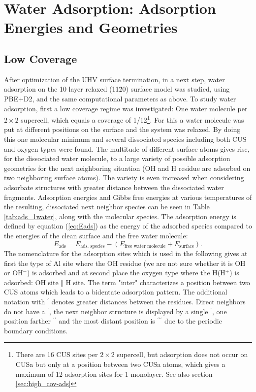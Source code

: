 \documentclass[11pt,DIV=13,BCOR=5mm,a4paper,headinclude]{scrbook}
\begin{document}
\section{Water Adsorption: Adsorption Energies and Geometries}\label{structure_search11-20}
\subsection{Low Coverage}
After optimization of the UHV surface termination, in a next step, water adsorption on the 10 layer relaxed (11\=20) surface model was studied, using PBE+D2, and the same computational parameters as above.
To study water adsorption, first a low coverage regime was investigated: One water molecule per $2\times 2$ supercell, which equals a coverage of 1/12\footnote{There are 16 CUS sites per $2\times 2$ supercell, but adsorption does not occur on CUSa but only at a position between two CUSa atoms, which gives a maximum of 12 adsorption sites for 1 monolayer. See also section \ref{sec:high_cov-ads}}.
For this a water molecule was put at different positions on the surface and the system was relaxed.
By doing this one molecular minimum and several dissociated species including both CUS and oxygen types were found.
The multitude of different surface atoms gives rise, for the dissociated water molecule, to a large variety of possible adsorption geometries for the next neighboring situation (OH and H residue are adsorbed on two neighboring surface atoms).
The variety is even increased when considering adsorbate structures with greater distance between the dissociated water fragments.
Adsorption energies and Gibbs free energies at various temperatures of the resulting, dissociated next neighbor species can be seen in Table \ref{tab:ads_1water}, along with the molecular species.
The adsorption energy is defined by equation (\ref{eq:Eads}) as the energy of the adsorbed species compared to the energies of the clean surface and the free water molecule:
\begin{equation}\label{eq:Eads}
 E_\textrm{ads}=E_\textrm{ads. species}-(E_\text{free water molecule}+E_\text{surface}).
\end{equation}
The nomenclature for the adsorption sites which is used in the following gives at first the type of Al site where the OH residue (we are not sure whether it is OH or OH$^-$) is adsorbed and at second place the oxygen type where the H(H$^+$) is adsorbed: OH site$\parallel$H site.
The term "inter" characterizes a position between two CUS atoms which leads to a bidentate adsorption pattern.
The additional notation with $^\prime$ denotes greater distances between the residues.
Direct neighbors do not have a $^\prime$, the next neighbor structure is displayed by a single $^\prime$, one position farther $^{\prime\prime}$ and the most distant position is $^{\prime\prime\prime}$ due to the periodic boundary conditions.
\end{document}

